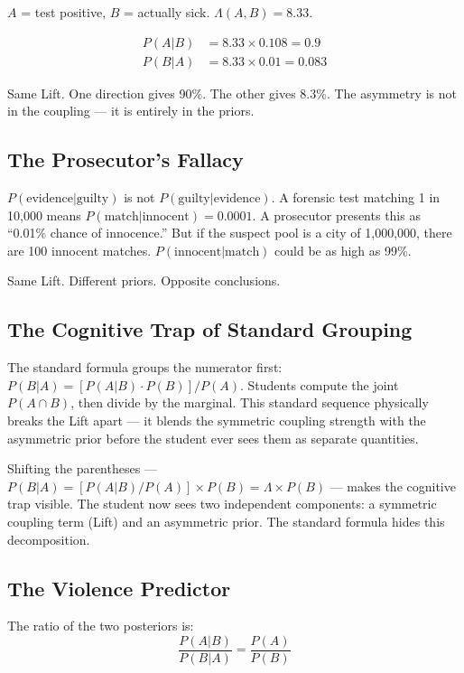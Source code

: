 \documentclass[12pt]{article}
\begin{document}
$A$ = test positive, $B$ = actually sick. $\Lambda(A,B) = 8.33$.

\begin{align}
P(A|B) &= 8.33 \times 0.108 = 0.9 \\
P(B|A) &= 8.33 \times 0.01 = 0.083
\end{align}

Same Lift. One direction gives 90\%. The other gives 8.3\%. The asymmetry is not in the coupling --- it is entirely in the priors.

\subsection{The Prosecutor's Fallacy}

$P(\text{evidence}|\text{guilty})$ is not $P(\text{guilty}|\text{evidence})$. A forensic test matching 1 in 10,000 means $P(\text{match}|\text{innocent}) = 0.0001$. A prosecutor presents this as ``0.01\% chance of innocence.'' But if the suspect pool is a city of 1,000,000, there are 100 innocent matches. $P(\text{innocent}|\text{match})$ could be as high as 99\%.

Same Lift. Different priors. Opposite conclusions.

\subsection{The Cognitive Trap of Standard Grouping}

The standard formula groups the numerator first: $P(B|A) = [P(A|B) \cdot P(B)] / P(A)$. Students compute the joint $P(A \cap B)$, then divide by the marginal. This standard sequence physically breaks the Lift apart --- it blends the symmetric coupling strength with the asymmetric prior before the student ever sees them as separate quantities.

Shifting the parentheses --- $P(B|A) = [P(A|B)/P(A)] \times P(B) = \Lambda \times P(B)$ --- makes the cognitive trap visible. The student now sees two independent components: a symmetric coupling term (Lift) and an asymmetric prior. The standard formula hides this decomposition.

\subsection{The Violence Predictor}

The ratio of the two posteriors is:
\begin{equation}
\frac{P(A|B)}{P(B|A)} = \frac{P(A)}{P(B)}
\end{equation}
\end{document}
